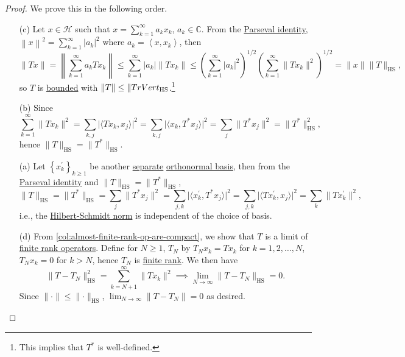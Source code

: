 \begin{proof}
	We prove this in the following order.
	\begin{enumerate}
		\item[(c)] Let \(x\in \mathcal{H} \) such that \(x = \sum_{k=1}^{\infty} a_{k} x_{k} \), \(a_{k} \in \mathbb{C} \). From the \hyperref[col:Parseval]{Parseval identity}, \(\left\lVert x\right\rVert ^{2} = \sum_{k=1}^{\infty}\left\vert a_{k}  \right\vert ^{2} \) where \(a_{k} = \left\langle x, x_{k}  \right\rangle \), then
			\[
				\lVert Tx \rVert
				= \left\lVert \sum_{k=1}^{\infty} a_{k} Tx_{k} \right\rVert
				\leq \sum_{k=1}^{\infty} \vert a_{k} \vert \lVert T x_{k} \rVert
				\leq \left( \sum_{k=1}^{\infty} \vert a_{k} \vert ^2 \right) ^{1 / 2} \left( \sum_{k=1}^{\infty} \lVert T x_{k} \rVert ^{2} \right) ^{1 / 2}
				= \lVert x \rVert \lVert T \rVert _{\mathrm{HS}},
			\]
			so \(T\) is \hyperref[def:bounded-linear-op]{bounded} with \(\lVert T \rVert \leq \lVert T\\rVert _{\mathrm{HS} }\).\footnote{This implies that \(T^{\ast} \) is well-defined.}
		\item[(b)] Since
			\[
				\sum_{k=1}^{\infty} \lVert Tx_{k} \rVert ^{2}
				= \sum_{k, j} \vert \langle  T x_{k} , x_{j} \rangle \vert ^{2}
				= \sum_{k, j} \vert \langle x_{k} , T^{\ast} x_{j} \rangle \vert ^{2}
				= \sum_{j} \lVert T^{\ast} x_{j} \rVert ^{2}
				= \lVert T^{\ast} \rVert ^{2} _{\mathrm{HS} },
			\]
			hence \(\lVert T\rVert _{\mathrm{HS} } = \lVert T^{\ast} \rVert _{\mathrm{HS} }\).
		\item[(a)] Let \(\left\{ x^\prime _k \right\}_{k\geq 1} \) be another \hyperref[def:separable]{separate} \hyperref[def:orthonormal-basis]{orthonormal basis}, then from the \hyperref[col:Parseval]{Parseval identity} and \(\lVert T \rVert _{\mathrm{HS} }= \lVert T^{\ast}  \rVert_{\mathrm{HS}}\),
			\[
				\lVert T \rVert _{\mathrm{HS} }
				= \lVert T^{\ast}  \rVert_{\mathrm{HS} }
				= \sum_{j} \lVert T^{\ast} x_{j} \rVert ^{2}
				= \sum_{j, k} \vert \langle x^\prime _{k} , T^{\ast} x_{j} \rangle \vert ^{2}
				= \sum_{j, k} \vert \langle T x^\prime _{k} , x_{j} \rangle \vert ^{2}
				= \sum_{k} \lVert T x^\prime _{k} \rVert ^{2},
			\]
			i.e., the \hyperref[def:Hilbert-Schmidt-norm]{Hilbert-Schmidt norm} is independent of the choice of basis.
		\item[(d)] From \autoref{col:almost-finite-rank-op-are-compact}, we show that \(T\) is a limit of \hyperref[rmk:finite-rank-op]{finite rank operators}. Define for \(N \geq 1\), \(T_N\) by \(T_N x_k = Tx_k\) for \(k = 1, 2, \dots  , N\), \(T_{N}x_k = 0 \) for \(k > N\), hence \(T_N\) is \hyperref[rmk:finite-rank-op]{finite rank}. We then have
			\[
				\lVert T - T_{N} \rVert ^{2} _{\mathrm{HS} }
				= \sum_{k=N+1}^{\infty} \lVert T x_{k} \rVert ^{2}
				\implies \lim_{N \to \infty} \lVert T - T_{N} \rVert _{\mathrm{HS} } = 0.
			\]
			Since \(\lVert \cdot \rVert \leq \lVert \cdot \rVert _{\mathrm{HS} }\), \(\lim_{N \to \infty} \lVert T - T_N\rVert = 0\) as desired.
	\end{enumerate}
\end{proof}

